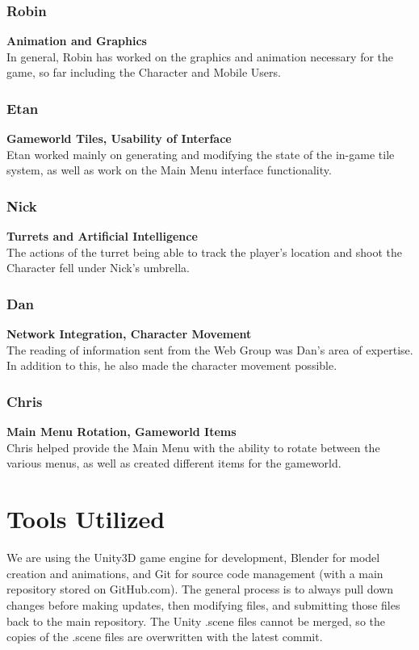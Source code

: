 \documentclass[10pt,letterpaper,oneside,english]{article}
\begin{document}
\subsubsection{Robin}
\textbf{Animation and Graphics} \\ In general, Robin has worked on the graphics and animation necessary for the game, so far including the Character and Mobile Users.

\subsubsection{Etan}
\textbf{Gameworld Tiles, Usability of Interface} \\ Etan worked mainly on generating and modifying the state of the in-game tile system, as well as work on the Main Menu interface functionality.

\subsubsection{Nick}
\textbf{Turrets and Artificial Intelligence} \\ The actions of the turret being able to track the player’s location and shoot the Character fell under Nick’s umbrella.

\subsubsection{Dan}
\textbf{Network Integration, Character Movement} \\ The reading of information sent from the Web Group was Dan’s area of expertise. In addition to this, he also made the character movement possible.

\subsubsection{Chris}
\textbf{Main Menu Rotation, Gameworld Items} \\ Chris helped provide the Main Menu with the ability to rotate between the various menus, as well as created different items for the gameworld.

\section{Tools Utilized}
We are using the Unity3D game engine for development, Blender for model creation and animations, and Git for source code management (with a main repository stored on GitHub.com). The general process is to always pull down changes before making updates, then modifying files, and submitting those files back to the main repository. The Unity .scene files cannot be merged, so the copies of the .scene files are overwritten with the latest commit.
\end{document}

